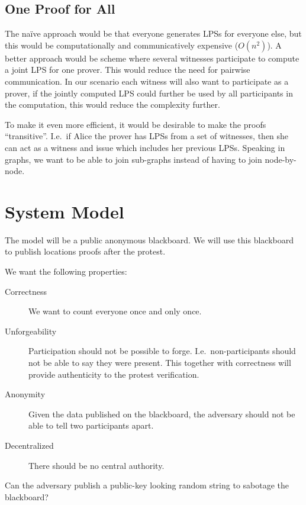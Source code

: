 \subsection{One Proof for All}

The naïve approach would be that everyone generates \acp{LPS} for everyone 
else, but this would be computationally and communicatively expensive 
(\(O(n^2)\)).
A better approach would be  scheme where several witnesses participate 
to compute a joint \ac{LPS} for one prover.
This would reduce the need for pairwise communication.
In our scenario each witness will also want to participate as a prover, if the 
jointly computed \ac{LPS} could further be used by all participants in the 
computation, this would reduce the complexity further.

To make it even more efficient, it would be desirable to make the proofs 
\enquote{transitive}.
I.e.\ if Alice the prover has \acp{LPS} from a set of witnesses, then she can 
act as a witness and issue  which includes her previous \acp{LPS}.
Speaking in graphs, we want to be able to join sub-graphs instead of having to 
join node-by-node.


\section{System Model}
\label{SystemModel}

The model will be a public anonymous blackboard.
We will use this blackboard to publish locations proofs after the protest.

We want the following properties:
\begin{description}
  \item[Correctness] We want to count everyone once and only once.
  \item[Unforgeability] Participation should not be possible to forge.
    I.e.\ non-participants should not be able to say they were present.
    This together with correctness will provide authenticity to the protest 
    verification.
  \item[Anonymity] Given the data published on the blackboard, the adversary 
    should not be able to tell two participants apart.
  \item[Decentralized] There should be no central authority.
\end{description}

Can the adversary publish a public-key looking random string to sabotage the 
blackboard?

